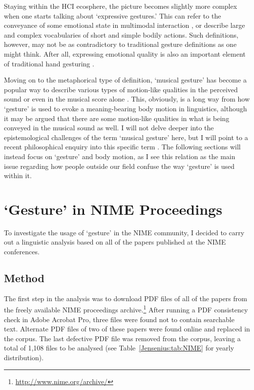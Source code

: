 Staying within the HCI ecosphere, the picture becomes slightly more complex when one starts talking about `expressive gestures.' This can refer to the conveyance of some emotional state in multimodal interaction \cite{Camurri:2002}, or describe
large and complex vocabularies of short and simple bodily actions. Such definitions, however, may not be as contradictory to traditional gesture definitions as one might think. After all, expressing emotional quality is also an important element of traditional hand gesturing \cite{Lawson:1973,McNeill:1992}.


Moving on to the metaphorical type of definition, `musical gesture' has become a popular way to describe various types of motion-like qualities in the perceived sound \cite{Godoy:2010} or even in the musical score alone \cite{Hatten:2004}. This, obviously, is a long way from how `gesture' is used to evoke a meaning-bearing body motion in linguistics, although it may be argued that there are some motion-like qualities in what is being conveyed in the musical sound as well. I will not delve deeper into the epistemological challenges of the term `musical gesture' here, but I will point to a recent philosophical enquiry into this specific term \cite{Funk:2013}. The following sections will instead focus on `gesture' and body motion, as I see this relation as the main issue regarding how people outside our field confuse the way `gesture' is used within it. 


\section{`Gesture' in NIME Proceedings}

To investigate the usage of `gesture' in the NIME community, I decided to carry out a linguistic analysis based on all of the papers published at the NIME conferences. 


\subsection{Method}

The first step in the analysis was to download PDF files of all of the papers from the freely available NIME proceedings archive.\footnote{\url{http://www.nime.org/archive/}} After running a PDF consistency check in Adobe Acrobat Pro, three files were found not to contain searchable text. Alternate PDF files of two of these papers were found online and replaced in the corpus. The last defective PDF file was removed from the corpus, leaving a total of 1,108 files to be analysed (see Table~\ref{Jensenius:tab:NIME} for yearly distribution).


